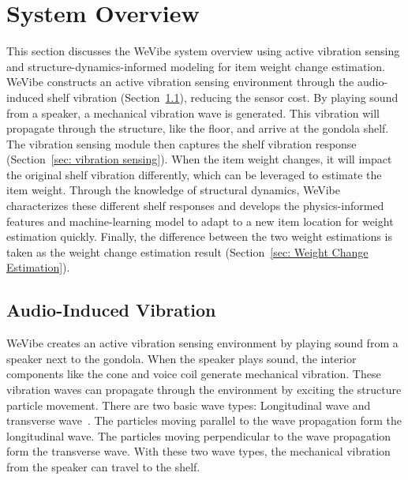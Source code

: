 \section{System Overview}
\label{sec:System Overview}
This section discusses the WeVibe system overview using active vibration sensing and structure-dynamics-informed modeling for item weight change estimation. WeVibe constructs an active vibration sensing environment through the audio-induced shelf vibration (Section~\ref{sec:audio induced vibration}), reducing the sensor cost. By playing sound from a speaker, a mechanical vibration wave is generated. This vibration will propagate through the structure, like the floor, and arrive at the gondola shelf. The vibration sensing module then captures the shelf vibration response (Section~\ref{sec: vibration sensing}). When the item weight changes, it will impact the original shelf vibration differently, which can be leveraged to estimate the item weight. Through the knowledge of structural dynamics, WeVibe characterizes these different shelf responses and develops the physics-informed features and machine-learning model to adapt to a new item location for weight estimation quickly. Finally, the difference between the two weight estimations is taken as the weight change estimation result (Section~\ref{sec: Weight Change Estimation}).

\subsection{Audio-Induced Vibration}
\label{sec:audio induced vibration}
WeVibe creates an active vibration sensing environment by playing sound from a speaker next to the gondola. When the speaker plays sound, the interior components like the cone and voice coil generate mechanical vibration. These vibration waves can propagate through the environment by exciting the structure particle movement. There are two basic wave types: Longitudinal wave and transverse wave~\cite{noh2023dynamics,yuan2022spatial}. The particles moving parallel to the wave propagation form the longitudinal wave. The particles moving perpendicular to the wave propagation form the transverse wave. With these two wave types, the mechanical vibration from the speaker can travel to the shelf.

